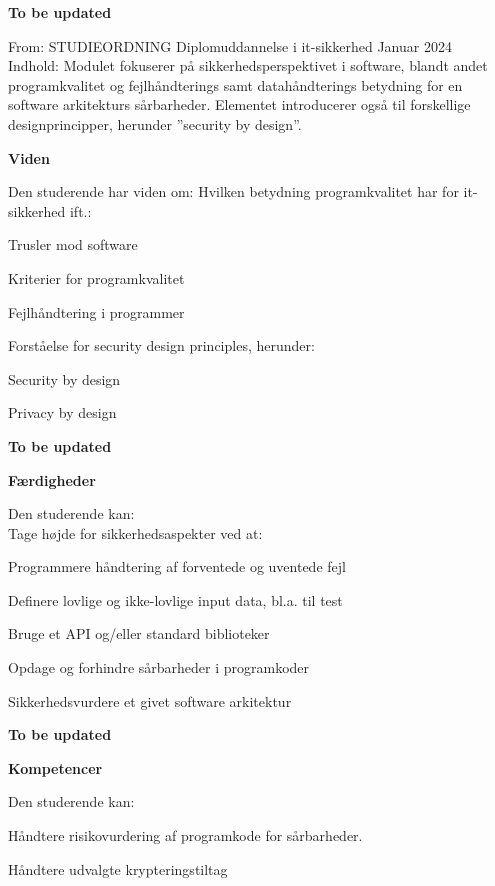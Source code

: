 \documentclass[Screen16to9,17pt]{foils}
\begin{document}

{\bf To be updated}

From: STUDIEORDNING Diplomuddannelse i it-sikkerhed Januar 2024\\
Indhold: Modulet fokuserer på sikkerhedsperspektivet i software, blandt andet programkvalitet og
fejlhåndterings samt datahåndterings betydning for en software arkitekturs sårbarheder.
Elementet introducerer også til forskellige designprincipper, herunder ”security by design”.

{\bf Viden}

Den studerende har viden om:
Hvilken betydning programkvalitet har for it-sikkerhed ift.:
\begin{list2}
\item Trusler mod software
\item Kriterier for programkvalitet
\item Fejlhåndtering i programmer
\item Forståelse for security design principles, herunder:
\item Security by design
\item Privacy by design
\end{list2}


{\bf To be updated}

{\bf Færdigheder}

Den studerende kan:\\
Tage højde for sikkerhedsaspekter ved at:
\begin{list2}
\item Programmere håndtering af forventede og uventede fejl
\item Definere lovlige og ikke-lovlige input data, bl.a. til test
\item Bruge et API og/eller standard biblioteker
\item Opdage og forhindre sårbarheder i programkoder
\item Sikkerhedsvurdere et givet software arkitektur
\end{list2}
{\bf To be updated}

{\bf Kompetencer}


Den studerende kan:
\begin{list2}
\item Håndtere risikovurdering af programkode for sårbarheder.
\item Håndtere udvalgte krypteringstiltag
\end{list2}
\end{document}
